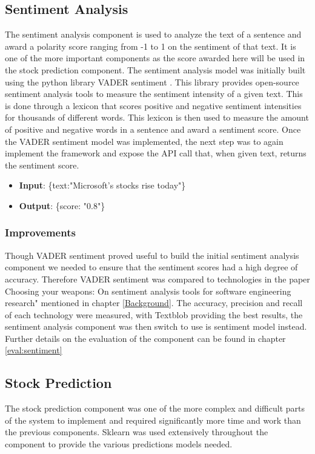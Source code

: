         \subsection{Sentiment Analysis}
        The sentiment analysis component is used to analyze the text of a sentence and award a polarity score ranging from -1 to 1 on the sentiment of that text. It is one of the more important components as the score awarded here will be used in the stock prediction component. The sentiment analysis model was initially built using the python library VADER sentiment \citep{Technology:Vader}. This library provides open-source sentiment analysis tools to measure the sentiment intensity of a given text. This is done through a lexicon that scores positive and negative sentiment intensities for thousands of different words. This lexicon is then used to measure the amount of positive and negative words in a sentence and award a sentiment score. Once the VADER sentiment model was implemented, the next step was to again implement the framework and expose the API call that, when given text, returns the sentiment score. 
        
            \begin{itemize}
                \item \textbf{Input}: \{text:"Microsoft's stocks rise today"\}
                \item \textbf{Output}: \{score: "0.8"\}
            \end{itemize}
        
            \subsubsection{Improvements}
            Though VADER sentiment proved useful to build the initial sentiment analysis component we needed to ensure that the sentiment scores had a high degree of accuracy. Therefore VADER sentiment was compared to technologies in the paper Choosing your weapons: On sentiment analysis tools for software engineering research" \citep{7332508} mentioned in chapter \ref{Background}. The accuracy, precision and recall of each technology were measured, with Textblob \cite{technology:Textblob} providing the best results, the sentiment analysis component was then switch to use is sentiment model instead. Further details on the evaluation of the component can be found in chapter \ref{eval:sentiment}
        
       
       
        \subsection{Stock Prediction}
        The stock prediction component was one of the more complex and difficult parts of the system to implement and required significantly more time and work than the previous components. Sklearn \citep{technology:Scikit-learn} was used extensively throughout the component to provide the various predictions models needed.
            
